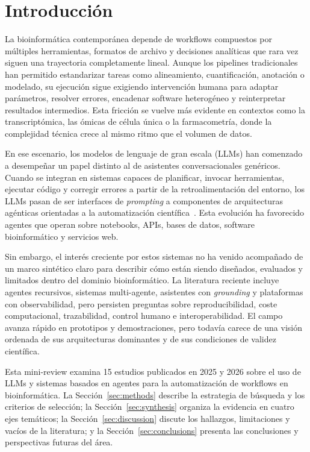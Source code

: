 
\section{Introducción}\label{sec:intro}

La bioinformática contemporánea depende de workflows compuestos por múltiples
herramientas, formatos de archivo y decisiones analíticas que rara vez siguen
una trayectoria completamente lineal. Aunque los pipelines tradicionales han
permitido estandarizar tareas como alineamiento, cuantificación, anotación o
modelado, su ejecución sigue exigiendo intervención humana para adaptar
parámetros, resolver errores, encadenar software heterogéneo y reinterpretar
resultados intermedios. Esta fricción se vuelve más evidente en contextos como
la transcriptómica, las ómicas de célula única o la farmacometría, donde la
complejidad técnica crece al mismo ritmo que el volumen de datos.

En ese escenario, los modelos de lenguaje de gran escala (LLMs) han comenzado a
desempeñar un papel distinto al de asistentes conversacionales genéricos.
Cuando se integran en sistemas capaces de planificar, invocar herramientas,
ejecutar código y corregir errores a partir de la retroalimentación del
entorno, los LLMs pasan de ser interfaces de \textit{prompting} a componentes
de arquitecturas agénticas orientadas a la automatización
científica~\citep{42042548,41912700}. Esta evolución ha favorecido agentes que
operan sobre notebooks, APIs, bases de datos, software bioinformático y
servicios web.

Sin embargo, el interés creciente por estos sistemas no ha venido acompañado de
un marco sintético claro para describir cómo están siendo diseñados, evaluados
y limitados dentro del dominio bioinformático. La literatura reciente incluye
agentes recursivos, sistemas multi-agente, asistentes con \textit{grounding} y
plataformas con observabilidad, pero persisten preguntas sobre
reproducibilidad, coste computacional, trazabilidad, control humano e
interoperabilidad. El campo avanza rápido en prototipos y demostraciones, pero
todavía carece de una visión ordenada de sus arquitecturas dominantes y de sus
condiciones de validez científica.

Esta mini-review examina 15 estudios publicados en 2025 y 2026 sobre el uso de
LLMs y sistemas basados en agentes para la automatización de workflows en
bioinformática. La Sección~\ref{sec:methods} describe la estrategia de búsqueda
y los criterios de selección; la Sección~\ref{sec:synthesis} organiza la
evidencia en cuatro ejes temáticos; la Sección~\ref{sec:discussion} discute los
hallazgos, limitaciones y vacíos de la literatura; y la
Sección~\ref{sec:conclusions} presenta las conclusiones y perspectivas futuras
del área.
